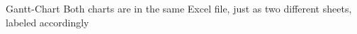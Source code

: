 Gantt-\/\+Chart Both charts are in the same Excel file, just as two different sheets, labeled accordingly 